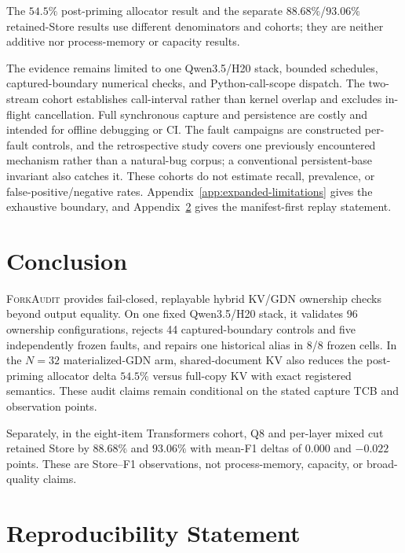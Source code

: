 \documentclass{article}
\newcommand{\method}{\textsc{ForkAudit}}
\begin{document}
The $54.5\%$ post-priming allocator result and the separate
$88.68\%$/$93.06\%$ retained-Store results use different denominators and
cohorts; they are neither additive nor process-memory or capacity results.

The evidence remains limited to one Qwen3.5/H20 stack, bounded schedules,
captured-boundary numerical checks, and Python-call-scope dispatch.  The
two-stream cohort establishes call-interval rather than kernel overlap and
excludes in-flight cancellation.  Full synchronous capture and persistence
are costly and intended for offline debugging or CI.  The fault campaigns are
constructed per-fault controls, and the retrospective study covers one
previously encountered mechanism rather than a natural-bug corpus; a
conventional persistent-base invariant also catches it.  These cohorts do not
estimate recall, prevalence, or false-positive/negative rates.
Appendix~\ref{app:expanded-limitations} gives the exhaustive boundary, and
Appendix~\ref{app:reproducibility} gives the manifest-first replay statement.

\section{Conclusion}

\method{} provides fail-closed, replayable hybrid KV/GDN ownership checks
beyond output equality.  On one fixed Qwen3.5/H20 stack, it validates 96
ownership configurations, rejects 44 captured-boundary controls and five
independently frozen faults, and repairs one historical alias in 8/8 frozen
cells.  In the $N=32$ materialized-GDN arm, shared-document KV also reduces the
post-priming allocator delta $54.5\%$ versus full-copy KV with exact registered
semantics.  These audit claims remain conditional on the stated capture TCB and
observation points.

Separately, in the eight-item Transformers cohort, Q8 and per-layer mixed cut
retained Store by $88.68\%$ and $93.06\%$ with mean-F1 deltas of $0.000$ and
$-0.022$ points.  These are Store--F1 observations, not process-memory, capacity,
or broad-quality claims.




\appendix

\section{Reproducibility Statement}
\label{app:reproducibility}
\end{document}
